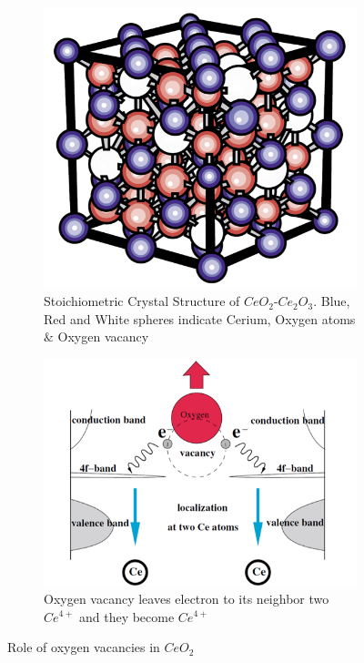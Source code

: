 \documentclass[main.tex]{subfiles}
\begin{document}
\begin{figure}[!htb]
\centering
	\begin{subfigure}[h]{0.35\textwidth}
		\centering
		\includegraphics[width=\linewidth]{ceo2}
  		\caption{Stoichiometric Crystal Structure of $CeO_{2}$-$Ce_{2}O_{3}$. Blue, Red and White spheres indicate Cerium, Oxygen atoms $\&$ Oxygen vacancy}
	\end{subfigure}
	\begin{subfigure}[h]{0.6\textwidth}
  		\centering
  		\includegraphics[width=\linewidth]{oxy_vacancy}
  		\caption{Oxygen vacancy leaves electron to its neighbor two $Ce^{4+}$ and they become $Ce^{4+}$}
	\end{subfigure}
\caption{Role of oxygen vacancies in $CeO_{2}$ \cite{skorodumova2002quantum}} 
\label{fig:fig}

\end{figure}
\FloatBarrier
\end{document}
